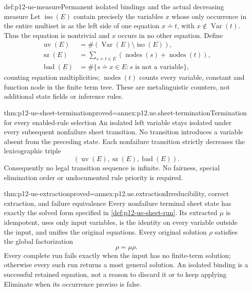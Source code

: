 \begin{hbdefinition}{def:p12-ue-measure}{Permanent isolated bindings and the actual decreasing measure}
Let \(\operatorname{iso}(E)\) contain precisely the variables \(x\)
whose only occurrence in the entire multiset is as the left side of
one equation \(x\doteq t\), with \(x\notin\operatorname{Var}(t)\).
Thus the equation is nontrivial and \(x\) occurs in no other equation.
Define
\[
 \begin{aligned}
 \operatorname{uv}(E)&=\#(\operatorname{Var}(E)\setminus\operatorname{iso}(E)),\\
 \operatorname{sz}(E)&=\sum_{s\doteq t\in E}
       (\operatorname{nodes}(s)+\operatorname{nodes}(t)),\\
 \operatorname{bad}(E)&=\#\{s\doteq x\in E:s\text{ is not a variable}\},
 \end{aligned}
\]
counting equation multiplicities; \(\operatorname{nodes}(t)\) counts every variable, constant
and function node in the finite term tree. These are metalinguistic
counters, not additional state fields or inference rules.
\end{hbdefinition}

\begin{hblemma}{thm:p12-ue-sheet-termination}{proved=annex:p12.ue.sheet-termination}{Termination for every enabled-rule selection}
An isolated left variable stays isolated under every subsequent
nonfailure sheet transition. No transition introduces a variable absent
from the preceding state. Each nonfailure transition strictly decreases
the lexicographic triple
\[
 (\operatorname{uv}(E),\operatorname{sz}(E),\operatorname{bad}(E)).
\]
Consequently no legal transition sequence is infinite. No fairness,
special elimination order or undocumented rule priority is required.
\end{hblemma}

\begin{hbtheorem}{thm:p12-ue-extraction}{proved=annex:p12.ue.extraction}{Irreducibility, correct extraction, and failure equivalence}
Every nonfailure terminal sheet state has exactly the solved form specified
in \cref{def:p12-ue-sheet-run}. Its extracted \(\mu\) is idempotent,
uses only input variables, is the identity on every variable outside the
input, and unifies the original equations. Every original solution
\(\rho\) satisfies the global factorization
\[
                              \rho=\mu\rho.
\]
Every complete run fails exactly when the input has no finite-term solution;
otherwise every such run returns a most general solution. An isolated
binding is a successful retained equation, not a reason to discard it
or to keep applying Eliminate when its occurrence proviso is false.
\end{hbtheorem}

